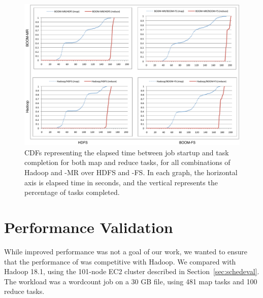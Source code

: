 \begin{figure}[ht]
	\includegraphics[width=0.95\linewidth]{graphs/fourgraphs}
\caption{CDFs representing the elapsed time between job startup and task
  completion for both map and reduce tasks, for all combinations of Hadoop and \BOOM-MR
  over HDFS and \BOOM-FS\@.  In each graph, the horizontal axis is
  elapsed time in seconds, and the vertical represents the percentage of tasks completed.}
\label{fig:ec2experiment}
\vspace{-8pt}
\end{figure}

\section{Performance Validation}
\label{sec:eval}
While improved performance was not a goal of our work, we wanted to
ensure that the performance of \BOOMA was competitive with Hadoop.
We compared \BOOMA with Hadoop 18.1, using the 101-node EC2 cluster
described in Section~\ref{sec:schedeval}. The workload was a wordcount job
on a 30 GB file, using 481 map tasks and 100 reduce tasks.

